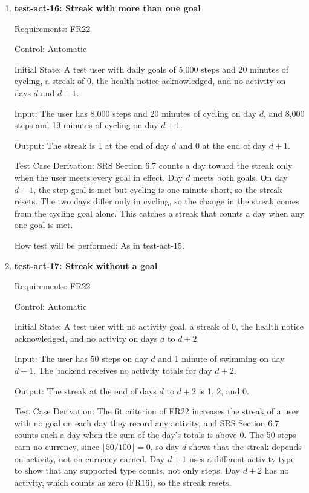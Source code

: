 \documentclass[12pt, titlepage]{article}
\begin{document}
\begin{enumerate}
How test will be performed: A pytest test sends each day's total or rest day,
moving the backend's clock between days, and reads the streak at the end of
each day through the API.

\item{\textbf{test-act-16: Streak with more than one goal}\\}

Requirements: FR22

Control: Automatic

Initial State: A test user with daily goals of 5,000 steps and 20 minutes of
cycling, a streak of 0, the health notice acknowledged, and no activity on
days $d$ and $d+1$.

Input: The user has 8,000 steps and 20 minutes of cycling on day $d$, and
8,000 steps and 19 minutes of cycling on day $d+1$.

Output: The streak is 1 at the end of day $d$ and 0 at the end of day $d+1$.

Test Case Derivation: SRS Section 6.7 counts a day toward the streak only when
the user meets every goal in effect. Day $d$ meets both goals. On day $d+1$,
the step goal is met but cycling is one minute short, so the streak resets.
The two days differ only in cycling, so the change in the streak comes from
the cycling goal alone. This catches a streak that counts a day when any one
goal is met.

How test will be performed: As in test-act-15.

\item{\textbf{test-act-17: Streak without a goal}\\}

Requirements: FR22

Control: Automatic

Initial State: A test user with no activity goal, a streak of 0, the health
notice acknowledged, and no activity on days $d$ to $d+2$.

Input: The user has 50 steps on day $d$ and 1 minute of swimming on day $d+1$.
The backend receives no activity totals for day $d+2$.

Output: The streak at the end of days $d$ to $d+2$ is 1, 2, and 0.

Test Case Derivation: The fit criterion of FR22 increases the streak of a
user with no goal on each day they record any activity, and SRS Section 6.7
counts such a day when the sum of the day's totals is above 0. The 50 steps
earn no currency, since $\lfloor 50 / 100 \rfloor = 0$, so day $d$ shows that
the streak depends on activity, not on currency earned. Day $d+1$ uses a
different activity type to show that any supported type counts, not only
steps. Day $d+2$ has no activity, which counts as zero (FR16), so the streak
resets.


\end{enumerate}
\end{document}
